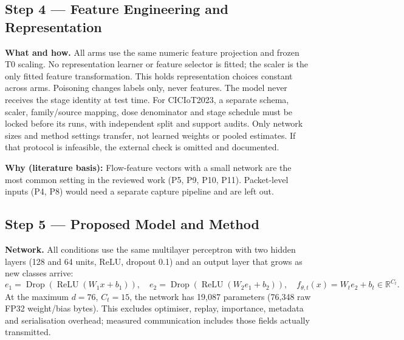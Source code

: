 \documentclass[10pt,a4paper]{article}
\newcommand{\why}[1]{\par\nopagebreak[4]\noindent\colorbox{black!5}{\parbox{\dimexpr\linewidth-2\fboxsep}{\small\textbf{Why (literature basis):} #1}}\par}
\begin{document}
\subsection{Step 4 --- Feature Engineering and Representation}
\textbf{What and how.} All arms use the same numeric feature projection and frozen T0 scaling. No representation learner or feature selector is fitted; the scaler is the only fitted feature transformation. This holds representation choices constant across arms. Poisoning changes labels only, never features. The model never receives the stage identity at test time. For CICIoT2023, a separate schema, scaler, family/source mapping, dose denominator and stage schedule must be locked before its runs, with independent split and support audits. Only network sizes and method settings transfer, not learned weights or pooled estimates. If that protocol is infeasible, the external check is omitted and documented.

\why{Flow-feature vectors with a small network are the most common setting in the reviewed work (P5, P9, P10, P11). Packet-level inputs (P4, P8) would need a separate capture pipeline and are left out.}

\subsection{Step 5 --- Proposed Model and Method}
\textbf{Network.} All conditions use the same multilayer perceptron with two hidden layers (128 and 64 units, ReLU, dropout 0.1) and an output layer that grows as new classes arrive:
\begin{equation}
e_1=\operatorname{Drop}(\operatorname{ReLU}(W_1x+b_1)),\quad
e_2=\operatorname{Drop}(\operatorname{ReLU}(W_2e_1+b_2)),\quad
f_{\theta,t}(x)=W_te_2+b_t\in\mathbb R^{C_t}.
\label{eq:head}
\end{equation}
At the maximum $d=76$, $C_t=15$, the network has 19,087 parameters (76,348 raw FP32 weight/bias bytes). This excludes optimiser, replay, importance, metadata and serialisation overhead; measured communication includes those fields actually transmitted.
\end{document}
